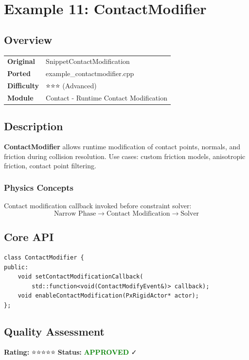 \section{Example 11: ContactModifier}
\subsection{Overview}
\begin{table}[h]
\centering
\begin{tabular}{|l|l|}
\hline
\textbf{Original} & SnippetContactModification \\
\textbf{Ported} & example\_contactmodifier.cpp \\
\textbf{Difficulty} & ⭐⭐⭐ (Advanced) \\
\textbf{Module} & Contact - Runtime Contact Modification \\
\hline
\end{tabular}
\end{table}

\subsection{Description}
\textbf{ContactModifier} allows runtime modification of contact points, normals, and friction during collision resolution. Use cases: custom friction models, anisotropic friction, contact point filtering.

\subsubsection{Physics Concepts}
Contact modification callback invoked before constraint solver:
\begin{equation}
\text{Narrow Phase} \rightarrow \text{Contact Modification} \rightarrow \text{Solver}
\end{equation}

\subsection{Core API}
\begin{lstlisting}
class ContactModifier {
public:
    void setContactModificationCallback(
        std::function<void(ContactModifyEvent&)> callback);
    void enableContactModification(PxRigidActor* actor);
};
\end{lstlisting}

\subsection{Quality Assessment}
\textbf{Rating:} ⭐⭐⭐⭐⭐ \quad \textbf{Status:} \textcolor{green}{\textbf{APPROVED}} ✓
